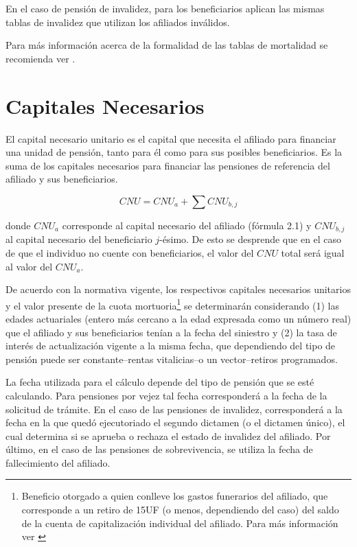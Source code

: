 \documentclass[letterpaper, 11pt]{article}
\begin{document}
En el caso de pensi\'on de invalidez, para los beneficiarios aplican las mismas
tablas de invalidez que utilizan los afiliados inv\'alidos. 

Para m\'as informaci\'on acerca de la formalidad de las tablas de mortalidad
se recomienda ver .

\section{Capitales Necesarios}

El capital necesario unitario es el capital que necesita el afiliado para financiar
una unidad de pensi\'on, tanto para \'el como para sus posibles beneficiarios. Es
la suma de los capitales necesarios para financiar las pensiones de referencia del
afiliado y sus beneficiarios.

\begin{equation*}
CNU = CNU_a + \sum{CNU_{b,j}}
\end{equation*}

\noindent donde $CNU_a$ corresponde al capital necesario del afiliado (f\'ormula
2.1) y $CNU_{b,j}$ al capital necesario del beneficiario $j$-\'esimo. De esto se
desprende que en el caso de que el individuo no cuente con beneficiarios, el valor
del $CNU$ total ser\'a igual al valor del $CNU_a$.

De acuerdo con la normativa vigente, los respectivos capitales necesarios unitarios
y el valor presente de la cuota mortuoria\footnote{Beneficio otorgado a quien conlleve
los gastos funerarios del afiliado, que corresponde a un retiro de 15UF (o menos,
dependiendo del caso) del saldo de la cuenta de capitalizaci\'on individual del
afiliado. Para m\'as informaci\'on ver \cite{compIIIcapII}} se determinar\'an
considerando (1) las edades actuariales (entero m\'as cercano a la edad expresada
como un n\'umero real) que el afiliado y sus beneficiarios ten\'ian a la fecha
del siniestro y (2) la tasa de inter\'es de actualizaci\'on vigente a la misma fecha,
que dependiendo del tipo de pensi\'on puede ser constante--rentas 
vitalicias--o un vector--retiros programados.

La fecha utilizada para el c\'alculo depende del tipo de pensi\'on que se est\'e
calculando. Para pensiones por vejez tal fecha corresponder\'a a la fecha
de la solicitud de tr\'amite. En el caso de las pensiones de invalidez, corresponder\'a
a la fecha en la que qued\'o ejecutoriado el segundo dictamen (o el dictamen \'unico), el cual determina
si se aprueba o rechaza el estado de invalidez del afiliado. Por \'ultimo, en el
caso de las pensiones de sobrevivencia, se utiliza la fecha de fallecimiento del 
afiliado.
\end{document}
